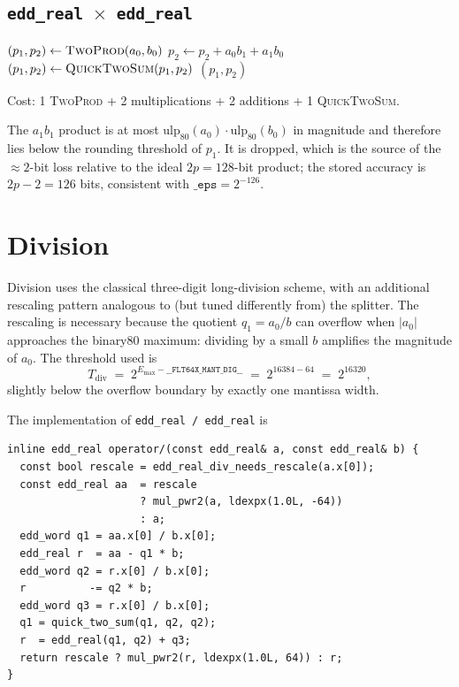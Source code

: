 \documentclass[11pt,a4paper]{article}
\begin{document}
\subsection{\texttt{edd\_real $\times$ edd\_real}}

\begin{algorithmic}[1]
\State $(p_1, p_2) \gets \textsc{TwoProd}(a_0, b_0)$
\State $p_2 \gets p_2 + a_0 b_1 + a_1 b_0$
\State $(p_1, p_2) \gets \textsc{QuickTwoSum}(p_1, p_2)$
\State \Return $(p_1, p_2)$
\end{algorithmic}
Cost: 1 \textsc{TwoProd} + 2 multiplications + 2 additions + 1
\textsc{QuickTwoSum}.

The $a_1 b_1$ product is at most
$\mathrm{ulp}_{80}(a_0) \cdot \mathrm{ulp}_{80}(b_0)$ in magnitude
and therefore lies below the rounding threshold of $p_1$.  It is
dropped, which is the source of the $\approx 2$-bit loss relative
to the ideal $2p = 128$-bit product; the stored accuracy is
$2p - 2 = 126$ bits, consistent with
$\texttt{\_eps} = 2^{-126}$.

\section{Division}
\label{sec:div}

Division uses the classical three-digit long-division scheme, with
an additional rescaling pattern analogous to (but tuned
differently from) the splitter.  The rescaling is necessary
because the quotient $q_1 = a_0 / b$ can overflow when $|a_0|$
approaches the binary80 maximum: dividing by a small $b$ amplifies
the magnitude of $a_0$.  The threshold used is
\[
  T_{\mathrm{div}} \;=\; 2^{E_{\max} - \texttt{\_\_FLT64X\_MANT\_DIG\_\_}}
  \;=\; 2^{16384 - 64} \;=\; 2^{16320},
\]
slightly below the overflow boundary by exactly one mantissa
width.

The implementation of \texttt{edd\_real / edd\_real} is

\begin{lstlisting}
inline edd_real operator/(const edd_real& a, const edd_real& b) {
  const bool rescale = edd_real_div_needs_rescale(a.x[0]);
  const edd_real aa  = rescale
                     ? mul_pwr2(a, ldexpx(1.0L, -64))
                     : a;
  edd_word q1 = aa.x[0] / b.x[0];
  edd_real r  = aa - q1 * b;
  edd_word q2 = r.x[0] / b.x[0];
  r          -= q2 * b;
  edd_word q3 = r.x[0] / b.x[0];
  q1 = quick_two_sum(q1, q2, q2);
  r  = edd_real(q1, q2) + q3;
  return rescale ? mul_pwr2(r, ldexpx(1.0L, 64)) : r;
}
\end{lstlisting}
\end{document}
